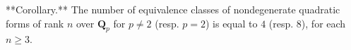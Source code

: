 **Corollary.** The number of equivalence classes of nondegenerate quadratic forms of rank $n$ over $\mathbf{Q}_p$ for $p \neq 2$ (resp. $p = 2$) is equal to $4$ (resp. $8$), for each $n \geq 3$.
